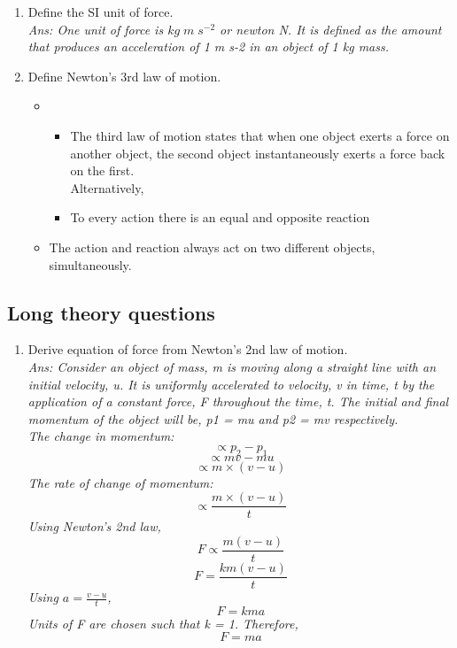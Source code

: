 \documentclass[12pt]{article}
\begin{document}
\begin{enumerate}
	\item Define the SI unit of force. \\
		{\itshape
			Ans:  One unit of force is $ kg \; m \; s^{-2} $ or newton N.
			It is defined as the amount that produces an 
			acceleration of 1 m s-2 in an object of 1 kg mass.
		}

	\item Define Newton's 3rd law of motion. \\
		{\itshape
			\begin{itemize}
				\item
			\begin{itemize}
				\item The third law of motion states that when one
				object exerts a force on another object, the
				second object instantaneously exerts a force
				back on the first. \\ Alternatively,
				\item To every action there is an equal
					and opposite reaction
			\end{itemize}
				\item The action and reaction always act on two different objects, simultaneously.
			\end{itemize}
		}

\end{enumerate}

\subsection*{Long theory questions}
\begin{enumerate}
	\item Derive equation of force from Newton's 2nd law of motion. \\
		{\itshape Ans:
			Consider an object of mass, m is moving along
			a straight line with an initial velocity, u. It is
			uniformly accelerated to velocity, v in time, t
			by the application of a constant force, F
			throughout the time, t. The initial and final
			momentum of the object will be, p1 = mu and p2 = mv respectively. \\
			The change in momentum:
			\[\propto p_2 - p_1\]
			\[\propto mv - mu\]
			\[\propto m \times (v - u)\]
			The rate of change of momentum: \[ \propto  \frac {m \times (v - u)}{t} \]
			Using Newton's 2nd law, 
			\[ F \propto \frac{m(v-u)}{t} \]
			\[ F = \frac{km(v-u)}{t} \]
			Using $ a = \frac{v-u}{t} $, 
			\[ F = kma \]
			Units of F are chosen such that k = 1. Therefore,
			\[ F = ma \]
		}
\end{enumerate}
\end{document}
